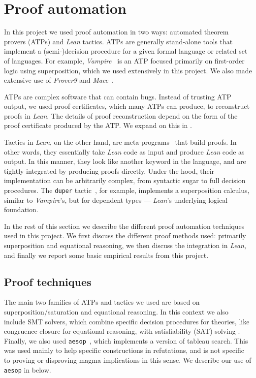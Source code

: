 \section{Proof automation}\label{automated-sec}

In this project we used proof automation in two ways: automated theorem provers (ATPs) and \emph{Lean} tactics.
ATPs are generally stand-alone tools that implement a (semi-)decision procedure for a given formal language or related set of languages.
For example, \emph{Vampire}~\cite{DBLP:conf/cav/KovacsV13} is an ATP focused primarily on first-order logic using superposition, which we used extensively in this project.  We also made extensive use of \emph{Prover9} and \emph{Mace}~\cite{prover9-mace4}.

ATPs are complex software that can contain bugs.
Instead of trusting ATP output, we used proof certificates, which many ATPs can produce, to reconstruct proofs in \emph{Lean}.
The details of proof reconstruction depend on the form of the proof certificate produced by the ATP.
We expand on this in .

Tactics in \emph{Lean}, on the other hand, are meta-programs~\cite{DBLP:journals/pacmpl/EbnerURAM17} that build proofs.
In other words, they essentially take \emph{Lean} code as input and produce \emph{Lean} code as output.
In this manner, they look like another keyword in the language, and are tightly integrated by producing proofs directly.
Under the hood, their implementation can be arbitrarily complex, from syntactic sugar to full decision procedures.
The \texttt{duper} tactic~\cite{DBLP:conf/itp/CluneQBA24}, for example, implements a superposition calculus, similar to \emph{Vampire}'s, but for dependent types --- \emph{Lean}'s underlying logical foundation.

In the rest of this section we describe the different proof automation techniques used in this project.
We first discuss the different proof methods used: primarily superposition and equational reasoning, we then discuss the integration in \emph{Lean}, and finally we report some basic empirical results from this project.

\subsection{Proof techniques}

The main two families of ATPs and tactics we used are based on superposition/saturation and equational reasoning.
In this context we also include SMT solvers, which combine specific decision procedures for theories, like congruence closure for equational reasoning, with satisfiability (SAT) solving \cite{deMoura-Bjorner-2009}.
Finally, we also used \texttt{aesop}~\cite{DBLP:conf/cpp/LimpergF23}, which implements a version of tableau search.
This was used mainly to help specific constructions in refutations, and is not specific to proving or disproving magma implications in this sense.
We describe our use of \texttt{aesop} in  below.

